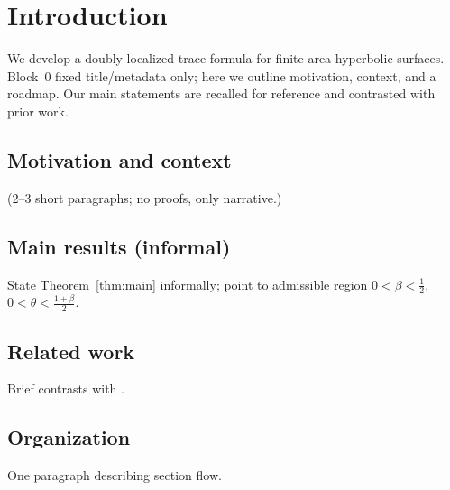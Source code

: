 \section{Introduction}\label{sec:intro}
We develop a doubly localized trace formula for finite-area hyperbolic surfaces.
Block~0 fixed title/metadata only; here we outline motivation, context, and a
roadmap.  Our main statements are recalled for reference and contrasted with prior work.

\subsection{Motivation and context}
(2–3 short paragraphs; no proofs, only narrative.)

\subsection{Main results (informal)}
State Theorem~\ref{thm:main} informally; point to admissible region
$0<\beta<\tfrac12$, $0<\theta<\tfrac{1+\beta}{2}$.

\subsection{Related work}
Brief contrasts with \cite{selberg1956,hejhal1976,hejhal1983,buser1992,zworski2012,dyatlovzworski2019,iwaniec1995,chazarain1974}.

\subsection{Organization}
One paragraph describing section flow.
